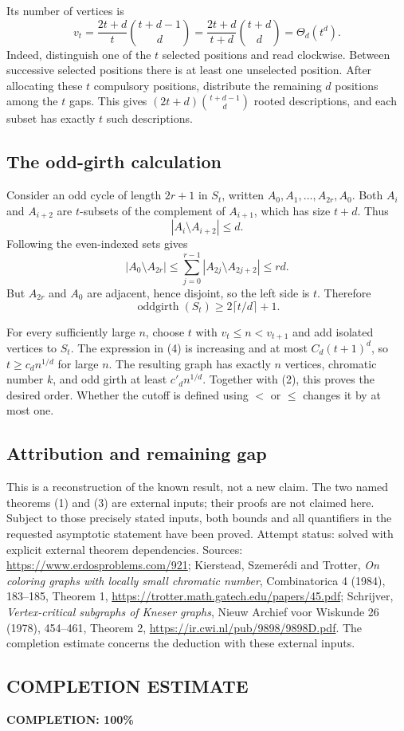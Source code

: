 Its number of vertices is
\[
 v_t=\frac{2t+d}{t}\binom{t+d-1}{d}
     =\frac{2t+d}{t+d}\binom{t+d}{d}
     =\Theta_d(t^d). \tag{4}
\]
Indeed, distinguish one of the \(t\) selected positions and read clockwise. Between successive selected positions there is at least one unselected position. After allocating these \(t\) compulsory positions, distribute the remaining \(d\) positions among the \(t\) gaps. This gives \((2t+d)\binom{t+d-1}{d}\) rooted descriptions, and each subset has exactly \(t\) such descriptions.

\subsection*{The odd-girth calculation}
Consider an odd cycle of length \(2r+1\) in \(S_t\), written
\(A_0,A_1,\ldots,A_{2r},A_0\).
Both \(A_i\) and \(A_{i+2}\) are \(t\)-subsets of the complement of \(A_{i+1}\), which has size \(t+d\). Thus
\[
 |A_i\setminus A_{i+2}|\leq d.
\]
Following the even-indexed sets gives
\[
 |A_0\setminus A_{2r}|
 \leq\sum_{j=0}^{r-1}|A_{2j}\setminus A_{2j+2}|
 \leq rd.
\]
But \(A_{2r}\) and \(A_0\) are adjacent, hence disjoint, so the left side is \(t\).
Therefore
\[
 \operatorname{oddgirth}(S_t)\geq 2\lceil t/d\rceil+1. \tag{5}
\]

For every sufficiently large \(n\), choose \(t\) with \(v_t\leq n<v_{t+1}\) and add isolated vertices to \(S_t\). The expression in (4) is increasing and at most \(C_d(t+1)^d\), so \(t\geq c_d n^{1/d}\) for large \(n\). The resulting graph has exactly \(n\) vertices, chromatic number \(k\), and odd girth at least \(c'_d n^{1/d}\).
Together with (2), this proves the desired order. Whether the cutoff is defined using \(<\) or \(\leq\) changes it by at most one.

\subsection*{Attribution and remaining gap}
This is a reconstruction of the known result, not a new claim. The two named theorems (1) and (3) are external inputs; their proofs are not claimed here. Subject to those precisely stated inputs, both bounds and all quantifiers in the requested asymptotic statement have been proved. Attempt status: solved with explicit external theorem dependencies.
Sources: \url{https://www.erdosproblems.com/921};
Kierstead, Szemer\'edi and Trotter, \emph{On coloring graphs with locally small chromatic number}, Combinatorica 4 (1984), 183--185, Theorem 1,
\url{https://trotter.math.gatech.edu/papers/45.pdf};
Schrijver, \emph{Vertex-critical subgraphs of Kneser graphs}, Nieuw Archief voor Wiskunde 26 (1978), 454--461, Theorem 2,
\url{https://ir.cwi.nl/pub/9898/9898D.pdf}.
The completion estimate concerns the deduction with these external inputs.
\subsection*{COMPLETION ESTIMATE}
\textbf{COMPLETION: 100\%}
